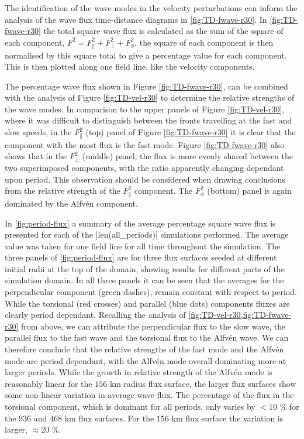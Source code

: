 The identification of the wave modes in the velocity perturbations can inform the analysis of the wave flux time-distance diagrams in \cref{fig:TD-fwave-r30}.
In \cref{fig:TD-fwave-r30} the total square wave flux is calculated as the sum of the square of each component, $ F^2 = F_\parallel^2 + F_\perp ^2  + F_\phi^2$, the square of each component is then normalised by this square total to give a percentage value for each component.
This is then plotted along one field line, like the velocity components.


The percentage wave flux shown in Figure \ref{fig:TD-fwave-r30}, can be combined with the analysis of Figure \ref{fig:TD-vel-r30} to determine the relative strengths of the wave modes.
In comparison to the upper panels of Figure \ref{fig:TD-vel-r30}, where it was difficult to distinguish between the fronts travelling at the fast and slow speeds, in the $F^2_\parallel$ (top) panel of Figure \ref{fig:TD-fwave-r30} it is clear that the component with the most flux is the fast mode.
Figure \ref{fig:TD-fwave-r30} also shows that in the $F^2_\perp$ (middle) panel, the flux is more evenly shared between the two superimposed components, with the ratio apparently changing dependant upon period.
This observation should be considered when drawing conclusions from the relative strength of the $F^2_\parallel$ component.
The $F^2_\phi$ (bottom) panel is again dominated by the Alfv\'en component.

In \cref{fig:period-flux} a summary of the average percentage square wave flux is presented for each of the \py[chapter6]|len(all_periods)| simulations performed.
The average value was taken for one field line for all time throughout the simulation.
The three panels of \cref{fig:period-flux} are for three flux surfaces seeded at different initial radii at the top of the domain, showing results for different parts of the simulation domain.
In all three panels it can be seen that the averages for the perpendicular component (green dashes), remain constant with respect to period.
While the torsional (red crosses) and parallel (blue dots) components fluxes are clearly period dependant.
Recalling the analysis of \cref{fig:TD-vel-r30,fig:TD-fwave-r30} from above, we can attribute the perpendicular flux to the slow wave, the parallel flux to the fast wave and the torsional flux to the Alfv\'en wave.
We can therefore conclude that the relative strengths of the fast mode and the Alfv\'en mode are period dependant, with the Alfv\'en mode overall dominating more at larger periods.
While the growth in relative strength of the Alfv\'en mode is reasonably linear for the $156$ km radius flux surface, the larger flux surfaces show some non-linear variation in average wave flux. 
The percentage of the flux in the torsional component, which is dominant for all periods, only varies by $<10$ \% for the $936$ and $468$ km flux surfaces.
For the $156$ km flux surface the variation is larger, $\approx 20$ \%.



